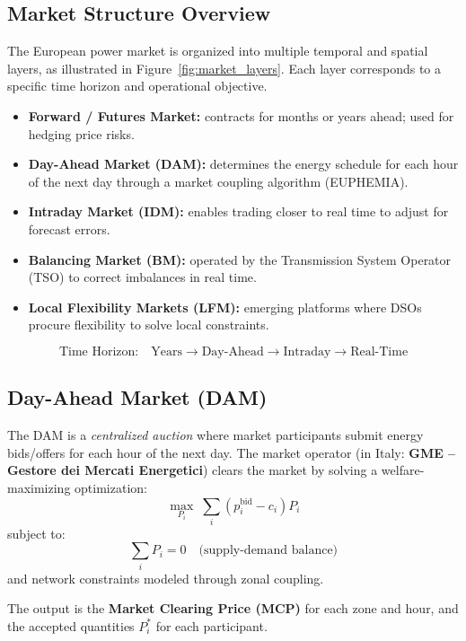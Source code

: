 \documentclass[11pt]{article}
\begin{document}
	\subsection{Market Structure Overview}
	
	The European power market is organized into multiple temporal and spatial layers, as illustrated in Figure~\ref{fig:market_layers}.  
	Each layer corresponds to a specific time horizon and operational objective.
	
	\begin{itemize}
		\item \textbf{Forward / Futures Market:} contracts for months or years ahead; used for hedging price risks.
		\item \textbf{Day-Ahead Market (DAM):} determines the energy schedule for each hour of the next day through a market coupling algorithm (EUPHEMIA).
		\item \textbf{Intraday Market (IDM):} enables trading closer to real time to adjust for forecast errors.
		\item \textbf{Balancing Market (BM):} operated by the Transmission System Operator (TSO) to correct imbalances in real time.
		\item \textbf{Local Flexibility Markets (LFM):} emerging platforms where DSOs procure flexibility to solve local constraints.
	\end{itemize}
	
	\begin{equation}
		\text{Time Horizon:} \quad \text{Years} \rightarrow \text{Day-Ahead} \rightarrow \text{Intraday} \rightarrow \text{Real-Time}
	\end{equation}
	
	\subsection{Day-Ahead Market (DAM)}
	
	The DAM is a \textit{centralized auction} where market participants submit energy bids/offers for each hour of the next day.  
	The market operator (in Italy: \textbf{GME – Gestore dei Mercati Energetici}) clears the market by solving a welfare-maximizing optimization:
	\[
	\max_{P_i} \; \sum_i (p_i^\text{bid} - c_i) P_i
	\]
	subject to:
	\[
	\sum_i P_i = 0 \quad \text{(supply-demand balance)}
	\]
	and network constraints modeled through zonal coupling.
	
	The output is the \textbf{Market Clearing Price (MCP)} for each zone and hour, and the accepted quantities $P_i^*$ for each participant.
	
\end{document}
